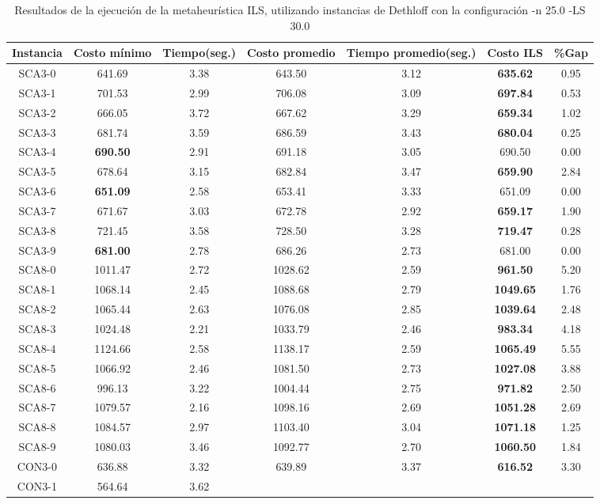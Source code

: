 \begin{table}[ht]
\caption{Resultados de la ejecución de la metaheurística ILS, utilizando instancias de Dethloff con la configuración -n 25.0 -LS 30.0}
\centering
\small
\begin{tabular}{c c c c c c c}
\hline\hline
Instancia & Costo mínimo & Tiempo(seg.) & Costo promedio & Tiempo promedio(seg.) & Costo ILS & \%Gap \\ [0.5ex]
\hline
SCA3-0 & 641.69 & 3.38 & 
643.50 & 3.12 & \bf{635.62} & 
0.95\\SCA3-1 & 701.53 & 2.99 & 
706.08 & 3.09 & \bf{697.84} & 
0.53\\SCA3-2 & 666.05 & 3.72 & 
667.62 & 3.29 & \bf{659.34} & 
1.02\\SCA3-3 & 681.74 & 3.59 & 
686.59 & 3.43 & \bf{680.04} & 
0.25\\SCA3-4 & \bf{690.50} & 2.91 & 
691.18 & 3.05 & 690.50 & 0.00\\
SCA3-5 & 678.64 & 3.15 & 
682.84 & 3.47 & \bf{659.90} & 
2.84\\SCA3-6 & \bf{651.09} & 2.58 & 
653.41 & 3.33 & 651.09 & 0.00\\
SCA3-7 & 671.67 & 3.03 & 
672.78 & 2.92 & \bf{659.17} & 
1.90\\SCA3-8 & 721.45 & 3.58 & 
728.50 & 3.28 & \bf{719.47} & 
0.28\\SCA3-9 & \bf{681.00} & 2.78 & 
686.26 & 2.73 & 681.00 & 0.00\\
SCA8-0 & 1011.47 & 2.72 & 
1028.62 & 2.59 & \bf{961.50} & 
5.20\\SCA8-1 & 1068.14 & 2.45 & 
1088.68 & 2.79 & \bf{1049.65} & 
1.76\\SCA8-2 & 1065.44 & 2.63 & 
1076.08 & 2.85 & \bf{1039.64} & 
2.48\\SCA8-3 & 1024.48 & 2.21 & 
1033.79 & 2.46 & \bf{983.34} & 
4.18\\SCA8-4 & 1124.66 & 2.58 & 
1138.17 & 2.59 & \bf{1065.49} & 
5.55\\SCA8-5 & 1066.92 & 2.46 & 
1081.50 & 2.73 & \bf{1027.08} & 
3.88\\SCA8-6 & 996.13 & 3.22 & 
1004.44 & 2.75 & \bf{971.82} & 
2.50\\SCA8-7 & 1079.57 & 2.16 & 
1098.16 & 2.69 & \bf{1051.28} & 
2.69\\SCA8-8 & 1084.57 & 2.97 & 
1103.40 & 3.04 & \bf{1071.18} & 
1.25\\SCA8-9 & 1080.03 & 3.46 & 
1092.77 & 2.70 & \bf{1060.50} & 
1.84\\CON3-0 & 636.88 & 3.32 & 
639.89 & 3.37 & \bf{616.52} & 
3.30\\CON3-1 & 564.64 & 3.62 & 

\end{tabular}
\end{table}
